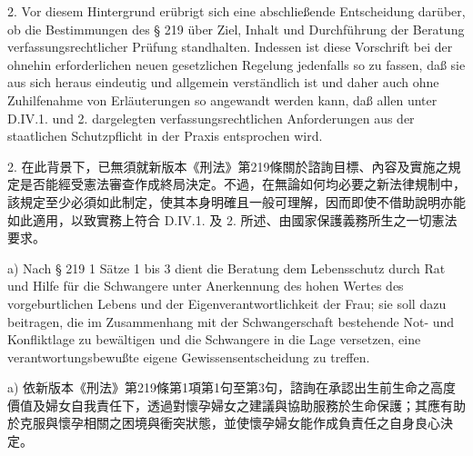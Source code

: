 \documentclass[12pt]{article}
\begin{document}
\begin{sourcepara}[title={原文E.176}]
2. Vor diesem Hintergrund erübrigt sich eine abschließende Entscheidung darüber, ob die Bestimmungen des § 219 \abbrStGB{} \abbrNF{} über Ziel, Inhalt und Durchführung der Beratung verfassungsrechtlicher Prüfung standhalten. Indessen ist diese Vorschrift bei der ohnehin erforderlichen neuen gesetzlichen Regelung jedenfalls so zu fassen, daß sie aus sich heraus eindeutig und allgemein verständlich ist und daher auch ohne Zuhilfenahme von Erläuterungen so angewandt werden kann, daß allen unter D.IV.1. und 2. dargelegten verfassungsrechtlichen Anforderungen aus der staatlichen Schutzpflicht in der Praxis entsprochen wird.
\end{sourcepara}
\begin{transpara}
2. 在此背景下，已無須就新版本《刑法》第219條關於諮詢目標、內容及實施之規定是否能經受憲法審查作成終局決定。不過，在無論如何均必要之新法律規制中，該規定至少必須如此制定，使其本身明確且一般可理解，因而即使不借助說明亦能如此適用，以致實務上符合 D.IV.1. 及 2. 所述、由國家保護義務所生之一切憲法要求。
\end{transpara}

\begin{sourcepara}[title={原文E.177}]
a) Nach § 219 \abbrAbs{} 1 Sätze 1 bis 3 \abbrStGB{} \abbrNF{} dient die Beratung dem Lebensschutz durch Rat und Hilfe für die Schwangere unter Anerkennung des hohen Wertes des vorgeburtlichen Lebens und der Eigenverantwortlichkeit der Frau; sie soll dazu beitragen, die im Zusammenhang mit der Schwangerschaft bestehende Not- und Konfliktlage zu bewältigen und die Schwangere in die Lage versetzen, eine verantwortungsbewußte eigene Gewissensentscheidung zu treffen.
\end{sourcepara}
\begin{transpara}
a) 依新版本《刑法》第219條第1項第1句至第3句，諮詢在承認出生前生命之高度價值及婦女自我責任下，透過對懷孕婦女之建議與協助服務於生命保護；其應有助於克服與懷孕相關之困境與衝突狀態，並使懷孕婦女能作成負責任之自身良心決定。
\end{transpara}
\end{document}
